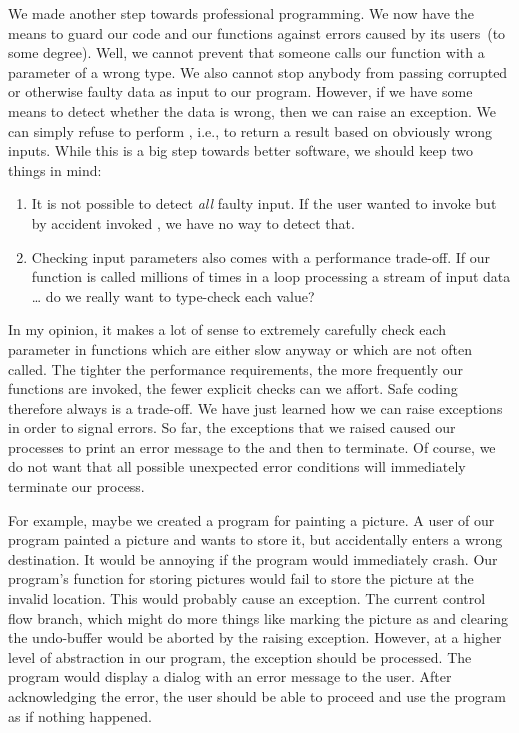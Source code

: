 We made another step towards professional programming.
We now have the means to guard our code and our functions against errors caused by its users~(to some degree).
Well, we cannot prevent that someone calls our function with a parameter of a wrong type.
We also cannot stop anybody from passing corrupted or otherwise faulty data as input to our program.
However, if we have some means to detect whether the data is wrong, then we can raise an exception.
We can simply refuse to perform , i.e., to return a result based on obviously wrong inputs.
While this is a big step towards better software, we should keep two things in mind:%
%
\begin{enumerate}%
%
\item It is not possible to detect \emph{all} faulty input. %
If the user wanted to invoke  but by accident invoked , we have no way to detect that.%
%
\item Checking input parameters also comes with a performance trade-off. %
If our  function is called millions of times in a loop processing a stream of input data {\dots} do we really want to  type-check each value?%
%
\end{enumerate}%
%
In my opinion, it makes a lot of sense to extremely carefully check each parameter in functions which are either slow anyway or which are not often called.
The tighter the performance requirements, the more frequently our functions are invoked, the fewer explicit checks can we affort.
Safe coding therefore always is a trade-off.%
%
\FloatBarrier%
\endhsection%
%
%
%
We have just learned how we can raise exceptions in order to signal errors.
So far, the exceptions that we raised caused our processes to print an error message to the  and then to terminate.
Of course, we do not want that all possible unexpected error conditions will immediately terminate our process.

For example, maybe we created a program for painting a picture.
A user of our program painted a picture and wants to store it, but accidentally enters a wrong destination.
It would be annoying if the program would immediately crash.
Our program's function for storing pictures would fail to store the picture at the invalid location.
This would probably cause an exception.
The current control flow branch, which might do more things like marking the picture as  and clearing the undo-buffer would be aborted by the raising exception.
However, at a higher level of abstraction in our program, the exception should be processed.
The program would display a dialog with an error message to the user.
After acknowledging the error, the user should be able to proceed and use the program as if nothing happened.


